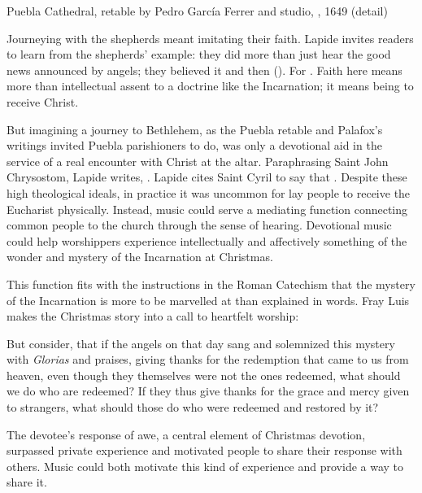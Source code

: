{Puebla Cathedral, retable by Pedro García Ferrer and studio,
, 1649 (detail)} 

Journeying with the shepherds meant imitating their faith.
Lapide invites readers to learn from the shepherds' example: they did more than
just hear the good news announced by angels; they believed it and then
().
For .%
    \Autocite[677, on ]{Lapide:Gospels19C}
Faith here means more than intellectual assent to a doctrine like the
Incarnation; it means being  to receive Christ.

But imagining a journey to Bethlehem, as the Puebla retable and Palafox's
writings invited Puebla parishioners to do, was only a devotional aid in the
service of a real encounter with Christ at the altar.
Paraphrasing Saint John Chrysostom, Lapide writes, .%
    \Autocite[672, on ]{Lapide:Gospels19C}
Lapide cites Saint Cyril to say that .
Despite these high theological ideals, in practice it was uncommon for lay
people to receive the Eucharist physically.
Instead, music could serve a mediating function connecting common people to the
church through the sense of hearing.
Devotional music could help worshippers experience intellectually and
affectively something of the wonder and mystery of the Incarnation at
Christmas.


This function fits with the instructions in the Roman Catechism that the mystery
of the Incarnation is more to be marvelled at than explained in words.
Fray Luis makes the Christmas story into a call to heartfelt worship:
\begin{quoting}
    But consider, that if the angels on that day sang and solemnized this
    mystery with \emph{Glorias} and praises, giving thanks for the redemption
    that came to us from heaven, even though they themselves were not the ones
    redeemed, what should we do who are redeemed?
    If they thus give thanks for the grace and mercy given to strangers, what
    should those do who were redeemed and restored by it?%
    \Autocite[41]{LuisdeGranada:Xmas}
\end{quoting}
The devotee's response of awe, a central element of Christmas devotion,
surpassed private experience and motivated people to share their response with
others.
Music could both motivate this kind of experience and provide a way
to share it.

